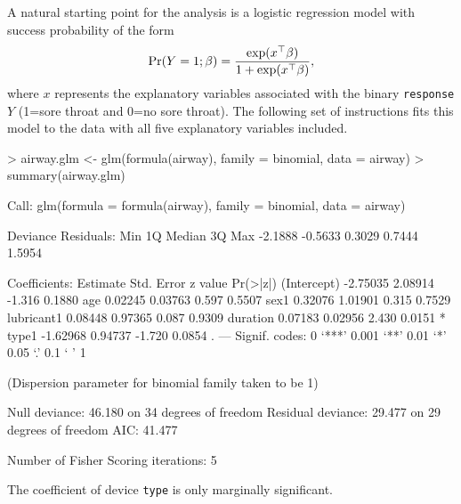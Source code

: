\documentclass[a4paper,11pt]{article}
\def\code{\texttt}
\begin{document}
A natural starting point for the analysis is a logistic regression model with success probability of the form
%
\[
{\rm Pr}(Y=1;\beta) = \frac{\exp(x^\top\beta)}{1+\exp(x^\top\beta)},
\]
%
where $x$ represents the explanatory variables associated with the binary \code{response} $Y$ (1=sore throat and 0=no sore throat).  The following set of instructions fits this model to the data with all five explanatory variables included.  
%
\begin{Schunk}
\begin{Sinput}
> airway.glm <- glm(formula(airway), family = binomial, data = airway)
> summary(airway.glm)
\end{Sinput}
\begin{Soutput}
Call:
glm(formula = formula(airway), family = binomial, data = airway)

Deviance Residuals: 
    Min       1Q   Median       3Q      Max  
-2.1888  -0.5633   0.3029   0.7444   1.5954  

Coefficients:
            Estimate Std. Error z value Pr(>|z|)  
(Intercept) -2.75035    2.08914  -1.316   0.1880  
age          0.02245    0.03763   0.597   0.5507  
sex1         0.32076    1.01901   0.315   0.7529  
lubricant1   0.08448    0.97365   0.087   0.9309  
duration     0.07183    0.02956   2.430   0.0151 *
type1       -1.62968    0.94737  -1.720   0.0854 .
---
Signif. codes:  0 ‘***’ 0.001 ‘**’ 0.01 ‘*’ 0.05 ‘.’ 0.1 ‘ ’ 1 

(Dispersion parameter for binomial family taken to be 1)

    Null deviance: 46.180  on 34  degrees of freedom
Residual deviance: 29.477  on 29  degrees of freedom
AIC: 41.477

Number of Fisher Scoring iterations: 5
\end{Soutput}
\end{Schunk}
%
The coefficient of device \code{type} is only marginally significant.  
\end{document}

